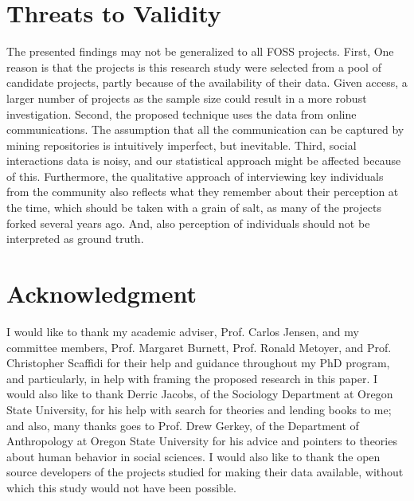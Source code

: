 \documentclass{acm_proc_article-sp}
\begin{document}
\section{Threats to Validity}
\label{threatsToValidity}
The presented findings may not be generalized to all FOSS projects. First, One reason is that the projects is this research study were selected from a pool of candidate projects, partly because of the availability of their data. Given access, a larger number of projects as the sample size could result in a more robust investigation. Second, the proposed technique uses the data from online communications. The assumption that all the communication can be captured by mining repositories is intuitively imperfect, but inevitable. Third, social interactions data is noisy, and our statistical approach might be affected because of this. Furthermore, the qualitative approach of interviewing key individuals from the community also reflects what they remember about their perception at the time, which should be taken with a grain of salt, as many of the projects forked several years ago. And, also perception of individuals should not be interpreted as ground truth.


\section*{Acknowledgment}
\label{acknowledgments}
I would like to thank my academic adviser, Prof. Carlos Jensen, and my committee members, Prof. Margaret Burnett, Prof. Ronald Metoyer, and Prof. Christopher Scaffidi for their help and guidance throughout my PhD program, and particularly, in help with framing the proposed research in this paper. I would also like to thank Derric Jacobs, of the Sociology Department at Oregon State University, for his help with search for theories and lending books to me; and also, many thanks goes to Prof. Drew Gerkey, of the Department of Anthropology at Oregon State University for his advice and pointers to theories about human behavior in social sciences.
I would also like to thank the open source developers of the projects studied for making their data available, without which this study would not have been possible. \\

%


  
\end{document}
